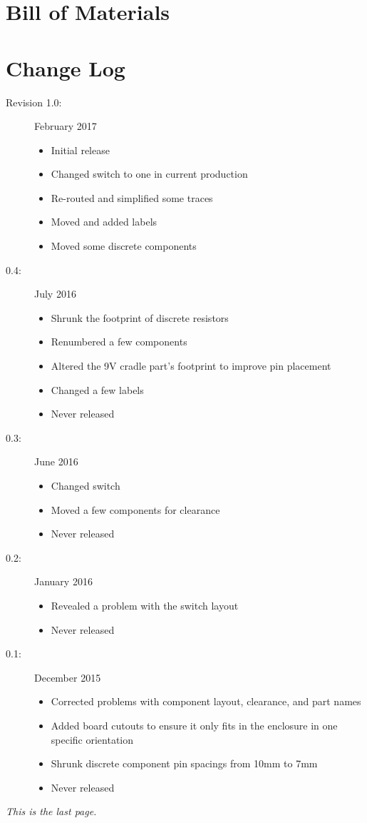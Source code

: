 \documentclass[12pt]{article}
\newcommand{\+}{\item}		%
\newcommand{\bi}{\begin{itemize}}
\newcommand{\ei}{\end{itemize}}
\newcommand{\bd}{\begin{description}}
\newcommand{\ed}{\end{description}}
\newcommand{\revision}{1.0}
\begin{document}
\clearpage
\newpage

\else
	\newpage
\fi


\begin{table}
\section*{Bill of Materials}

\end{table}

\clearpage

\section{Change Log}

\bd

\+[Revision \revision{}:] February 2017
\bi
\+ Initial release
\+ Changed switch to one in current production
\+ Re-routed and simplified some traces
\+ Moved and added labels
\+ Moved some discrete components
\ei

\+[0.4:] July 2016
\bi
\+ Shrunk the footprint of discrete resistors
\+ Renumbered a few components
\+ Altered the 9V cradle part's footprint to improve pin placement
\+ Changed a few labels
\+ Never released
\ei

\+[0.3:] June 2016
\bi
\+ Changed switch
\+ Moved a few components for clearance
\+ Never released
\ei


\+[0.2:] January 2016
\bi
\+ Revealed a problem with the switch layout
\+ Never released
\ei

\+[0.1:] December 2015
\bi
\+ Corrected problems with component layout, clearance, and part names
\+ Added board cutouts to ensure it only fits in the enclosure in one specific orientation
\+ Shrunk discrete component pin spacings from 10mm to 7mm
\+ Never released
\ei
\ed

\vfill

\begin{center}
\emph{This is the last page.}
\end{center}
\end{document}
